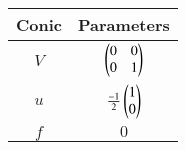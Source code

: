 \begin{tabular}[12pt]{ |c| c|}
    \hline
    \textbf{Conic}& \textbf{Parameters}\\ 
    \hline
     $V$& $\begin{pmatrix}0 & 0 \\ 0 & 1\end{pmatrix}$\\
    \hline 
     $u$& $\frac{-1}{2}\begin{pmatrix}1\\0\end{pmatrix}$\\
    \hline
     $f$& $0$\\
     \hline
    \end{tabular}
